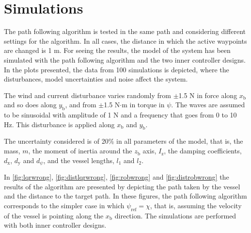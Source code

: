 \section{Simulations}\label{sec:pathSim}
The path following algorithm is tested in the same path and considering different settings for the algorithm. In all cases, the distance in which the active waypoints are changed is \num{1} m. For seeing the results, the model of the system has been simulated with the path following algorithm and the two inner controller designs. In the plots presented, the data from 100 simulations is depicted, where the disturbances, model uncertainties and noise affect the system.

The wind and current disturbance varies randomly from $\pm$\num{1.5} N in force along $x_\mathrm{b}$ and so does along $y_\mathrm{b}$, and from $\pm$\num{1.5} N$\cdot$m in torque in $\psi$. The waves are assumed to be sinusoidal with amplitude of 1 N and a frequency that goes from 0 to 10 Hz. This disturbance is applied along $x_\mathrm{b}$ and $y_\mathrm{b}$. 

The uncertainty considered is of 20\% in all parameters of the model, that is, the mass, $m$, the moment of inertia around the $z_\mathrm{b}$ axis, $I_\mathrm{z}$, the damping coefficients, $d_\mathrm{x}$, $d_\mathrm{y}$ and $d_\psi$, and the vessel lengths, $l_1$ and $l_2$.  

In \autoref{fig:lqrwrong}, \ref{fig:distlqrwrong}, \ref{fig:robwrong} and \ref{fig:distrobwrong} the results of the algorithm are presented by depicting the path taken by the vessel and the distance to the target path. In these figures, the path following algorithm corresponds to the simpler case in which $\psi_\mathrm{ref} = \chi$, that is, assuming the velocity of the vessel is pointing along the $x_\mathrm{b}$ direction. The simulations are performed with both inner controller designs. 

